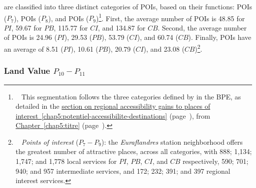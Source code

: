 \begin{refsegment}
 are classified into three distinct categories of \acrfull{POIs}, based on their functions:  \acrshort{POIs} (\(P_{7}\)),  \acrshort{POIs} (\(P_{8}\)), and  \acrshort{POIs} (\(P_{9}\))\footnote{~
    This segmentation follows the three categories defined by \textcolor{blue}{\textcite{insee_base_2021}} in the \acrfull{BPE}, as detailed in the \hyperref[chap5:potentiel-accessibilite-destinations]{section on regional accessibility gains to places of interest~\ref{chap5:potentiel-accessibilite-destinations}} (page~\pageref{chap5:potentiel-accessibilite-destinations}), from \hyperref[chap5:titre]{Chapter~\ref{chap5:titre}} (page~\pageref{chap5:titre}).
}. First, the average number of  \acrshort{POIs} is 48.85 for \(PI\), 59.67 for \(PB\), 115.77 for \(CI\), and 134.87 for \(CB\). Second, the average number of  \acrshort{POIs} is 24.96 (\(PI\)), 29.53 (\(PB\)), 53.79 (\(CI\)), and 60.74 (\(CB\)). Finally,  \acrshort{POIs} have an average of 8.51 (\(PI\)), 10.61 (\(PB\)), 20.79 (\(CI\)), and 23.08 (\(CB\))\footnote{~
    \textsl{Points of interest} (\(P_{7} - P_{9}\)): the \textsl{Euraflandres} station neighborhood offers the greatest number of attractive places, across all categories, with 888; 1,134; 1,747; and 1,778 local services for \(PI\), \(PB\), \(CI\), and \(CB\) respectively, 590; 701; 940; and 957 intermediate services, and 172; 232; 391; and 397 regional interest services.
}.%

\subsubsection*{Land Value \(P_{10} - P_{11}\)
    \label{chap6:indicateurs-place-foncier}
    }
    

\end{refsegment}

